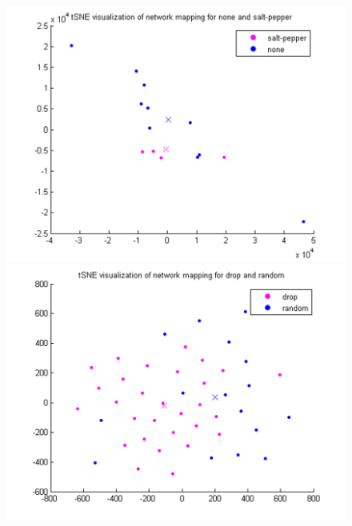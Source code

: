 \documentclass{article} %
\begin{document}
\begin{figure}[ht]
\begin{minipage}[b]{0.5\linewidth}
    \centering
    \includegraphics[width=\linewidth]{A-tSNE_salt_pepper-none.png} 
    \vspace{4ex}
  \end{minipage}%
  \begin{minipage}[b]{0.5\linewidth}
    \centering
    \includegraphics[width=\linewidth]{A-tSNE_drop-random.png} 
    \vspace{4ex}
  \end{minipage} 
  \begin{minipage}[b]{0.5\linewidth}
    \centering

\end{minipage}
\end{figure}
\end{document}
